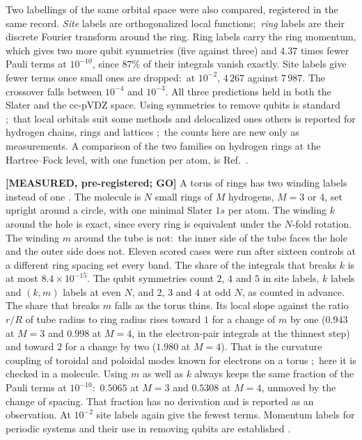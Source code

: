 \documentclass[aps,pra,twocolumn,superscriptaddress,longbibliography]{revtex4-2}
\begin{document}
Two labellings of the same orbital space were also compared, registered in
the same record.  \emph{Site} labels are orthogonalized local functions;\
\emph{ring} labels are their discrete Fourier transform around the ring.
Ring labels carry the ring momentum, which gives two more qubit symmetries
(five against three) and $4.37$ times fewer Pauli terms at $10^{-10}$,
since $87\%$ of their integrals vanish exactly.  Site labels give fewer
terms once small ones are dropped:\ at $10^{-2}$, $4\,267$ against $7\,987$.
The crossover falls between $10^{-4}$ and $10^{-3}$.  All three
predictions held in both the Slater and the cc-pVDZ space.  Using
symmetries to remove qubits is standard \cite{bravyi2017tapering};\ that
local orbitals suit some methods and delocalized ones others is reported
for hydrogen chains, rings and lattices \cite{stair2020};\ the counts here are new
only as measurements.  A comparison of the two families on hydrogen rings
at the Hartree--Fock level, with one function per atom, is
Ref.~\cite{reinhardt2011}.

\textbf{[MEASURED, pre-registered; GO]}  A torus of rings has two
winding labels instead of one \cite{tr_record}.  The molecule is $N$
small rings of $M$ hydrogens, $M=3$ or $4$, set upright around a circle,
with one minimal Slater $1s$ per atom.  The winding $k$ around the hole is
exact, since every ring is equivalent under the $N$-fold rotation.  The
winding $m$ around the tube is not:\ the inner side of the tube faces the
hole and the outer side does not.  Eleven scored cases were run after
sixteen controls at a different ring spacing set every band.  The share
of the integrals that breaks $k$ is at most $8.4\times10^{-15}$.  The qubit
symmetries count $2$, $4$ and $5$ in site labels, $k$ labels and $(k,m)$
labels at even $N$, and $2$, $3$ and $4$ at odd $N$, as counted in
advance.  The share that breaks $m$ falls as the torus thins.  Its local
slope against the ratio $r/R$ of tube radius to ring radius rises toward
$1$ for a change of $m$ by one ($0.943$ at $M=3$ and $0.998$ at $M=4$, in
the electron-pair integrals at the thinnest step) and toward $2$ for a
change by two ($1.980$ at $M=4$).  That is the curvature coupling of
toroidal and poloidal modes known for electrons on a torus
\cite{encinosa2022};\ here it is checked in a molecule.  Using $m$ as well
as $k$ always keeps the same fraction of the Pauli terms at $10^{-10}$:\
$0.5065$ at $M=3$ and $0.5308$ at $M=4$, unmoved by the change of spacing.
That fraction has no derivation and is reported as an observation.  At
$10^{-2}$ site labels again give the fewest terms.  Momentum labels for
periodic systems and their use in removing qubits are established
\cite{manrique2020,picozzi2026}.
\end{document}
